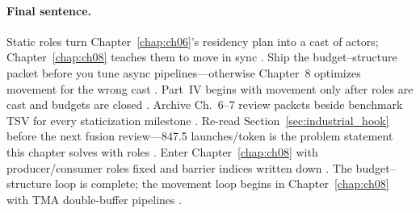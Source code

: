 \paragraph{Final sentence.}
Static roles turn Chapter~\ref{chap:ch06}'s residency plan into a cast of actors; Chapter~\ref{chap:ch08} teaches them to move in sync \citep{dao2022flashattention,semianalysis2024tma,shah2024flashattention3,yirage2026,mpk2025,patel2025llminference,taxbreak2026,memoryfloor2026,wu2024mirage,chen2020compilerbasedhardw,nvidia2022hopper,amd2024xdna,kwon2023vllm,dlbook,nvidia2024cudagraphs,amd2024aie,rotem2018glow,liu2024deepseekv3,dao2023flashdecoding}.
Ship the budget--structure packet before you tune async pipelines---otherwise Chapter~8 optimizes movement for the wrong cast \citep{semianalysis2024tma,yirage2026,shah2024flashattention3,patel2025llminference,taxbreak2026}.
Part~IV begins with movement only after roles are cast and budgets are closed \citep{dao2022flashattention,mpk2025,memoryfloor2026,chen2020compilerbasedhardw}.
Archive Ch.~6--7 review packets beside benchmark TSV for every staticization milestone \citep{yirage2026,taxbreak2026,patel2025llminference,shah2024flashattention3,wu2024mirage}.
Re-read Section~\ref{sec:industrial_hook} before the next fusion review---847.5 launches/token is the problem statement this chapter solves with roles \citep{taxbreak2026,mpk2025,memoryfloor2026,nvidia2024cudagraphs}.
Enter Chapter~\ref{chap:ch08} with producer/consumer roles fixed and barrier indices written down \citep{semianalysis2024tma,dao2022flashattention,shah2024flashattention3,yirage2026}.
The budget--structure loop is complete; the movement loop begins in Chapter~\ref{chap:ch08} with TMA double-buffer pipelines \citep{semianalysis2024tma,dao2022flashattention,mpk2025,patel2025llminference,chen2020compilerbasedhardw,taxbreak2026,memoryfloor2026,yirage2026}.

